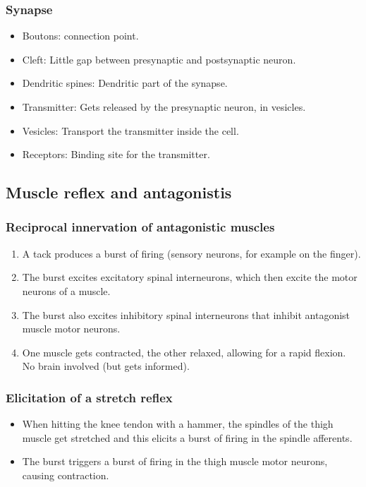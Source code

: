 \documentclass[main]{subfiles}
\begin{document}
\subsubsection{Synapse}
\begin{itemize}[noitemsep,nolistsep]
	\item Boutons: connection point.
	\item Cleft: Little gap between presynaptic and postsynaptic neuron.
	\item Dendritic spines: Dendritic part of the synapse.
	\item Transmitter: Gets released by the presynaptic neuron, in vesicles.
	\item Vesicles: Transport the transmitter inside the cell.
	\item Receptors: Binding site for the transmitter.
\end{itemize}

\subsection{Muscle reflex and antagonistis}
\subsubsection{Reciprocal innervation of antagonistic muscles}
\begin{enumerate}
	\item A tack produces a burst of firing (sensory neurons, for example on the finger).
	\item The burst excites excitatory spinal interneurons, which then excite the motor neurons of a muscle.
	\item The burst also excites inhibitory spinal interneurons that inhibit antagonist muscle motor neurons.
	\item One muscle gets contracted, the other relaxed, allowing for a rapid flexion. No brain involved (but gets informed).
\end{enumerate}
\subsubsection{Elicitation of a stretch reflex}
\begin{itemize}[noitemsep,nolistsep]
	\item When hitting the knee tendon with a hammer, the spindles of the thigh muscle get stretched and this elicits a burst of firing in the spindle afferents.
	\item The burst triggers a burst of firing in the thigh muscle motor neurons, causing contraction.
\end{itemize}
\end{document}
